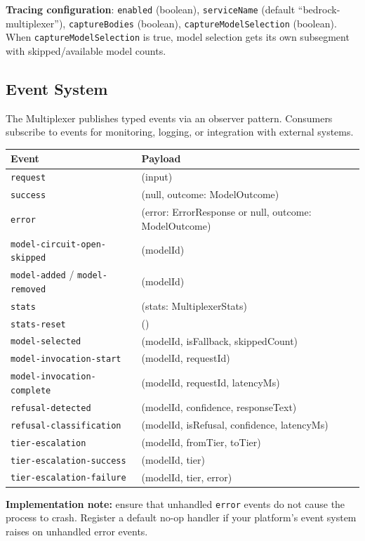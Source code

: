 \documentclass[10pt,letterpaper]{article}
\newcommand{\fld}[1]{\texttt{#1}}
\begin{document}
\medskip
\noindent\textbf{Tracing configuration}: \fld{enabled} (boolean), \fld{serviceName} (default ``bedrock-multiplexer''), \fld{captureBodies} (boolean), \fld{captureModelSelection} (boolean). When \fld{captureModelSelection} is true, model selection gets its own subsegment with skipped/available model counts.

\subsection*{Event System}

The Multiplexer publishes typed events via an observer pattern. Consumers subscribe to events for monitoring, logging, or integration with external systems.

\smallskip
\begin{tabular}{@{}l l@{}}
\toprule
\textbf{Event} & \textbf{Payload} \\
\midrule
\texttt{request} & (input) \\
\texttt{success} & (null, outcome: ModelOutcome) \\
\texttt{error} & (error: ErrorResponse or null, outcome: ModelOutcome) \\
\texttt{model-circuit-open-skipped} & (modelId) \\
\texttt{model-added} / \texttt{model-removed} & (modelId) \\
\texttt{stats} & (stats: MultiplexerStats) \\
\texttt{stats-reset} & () \\
\texttt{model-selected} & (modelId, isFallback, skippedCount) \\
\texttt{model-invocation-start} & (modelId, requestId) \\
\texttt{model-invocation-complete} & (modelId, requestId, latencyMs) \\
\texttt{refusal-detected} & (modelId, confidence, responseText) \\
\texttt{refusal-classification} & (modelId, isRefusal, confidence, latencyMs) \\
\texttt{tier-escalation} & (modelId, fromTier, toTier) \\
\texttt{tier-escalation-success} & (modelId, tier) \\
\texttt{tier-escalation-failure} & (modelId, tier, error) \\
\bottomrule
\end{tabular}

\smallskip
\noindent\textbf{Implementation note:} ensure that unhandled \texttt{error} events do not cause the process to crash. Register a default no-op handler if your platform's event system raises on unhandled error events.
\end{document}
